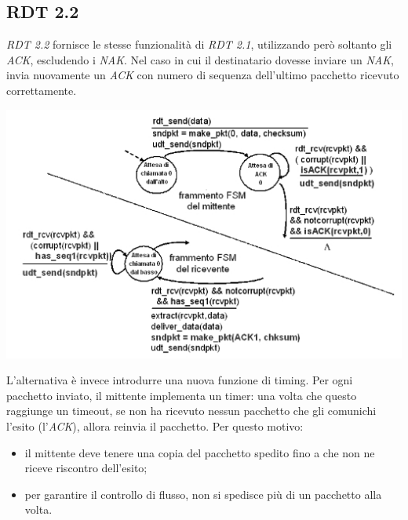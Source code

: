 \subsection{RDT 2.2}
\textit{RDT 2.2} fornisce le stesse funzionalità di \textit{RDT 2.1}, utilizzando però soltanto gli \textit{ACK}, escludendo i \textit{NAK}.
Nel caso in cui il destinatario dovesse inviare un \textit{NAK}, invia nuovamente un \textit{ACK} con numero di sequenza dell'ultimo pacchetto ricevuto correttamente.
\begin{center}
    \includegraphics[width=.7\textwidth]{res/fsm-rdt-22.jpg} \hfill
\end{center}
L'alternativa è invece introdurre una nuova funzione di timing. Per ogni pacchetto inviato, il mittente implementa un timer: una volta che questo raggiunge un timeout, se non ha ricevuto nessun pacchetto che gli comunichi l'esito (l'\textit{ACK}), allora reinvia il pacchetto. Per questo motivo:
\begin{itemize}
    \item il mittente deve tenere una copia del pacchetto spedito fino a che non ne riceve riscontro dell'esito;
    \item per garantire il controllo di flusso, non si spedisce più di un pacchetto alla volta.
\end{itemize}